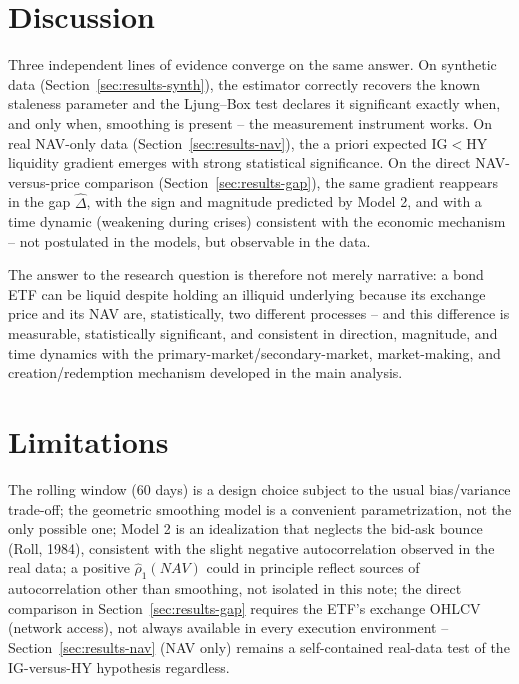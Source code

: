 \documentclass[11pt]{article}
\begin{document}
\section{Discussion}
\label{sec:discussion}

Three independent lines of evidence converge on the same answer. On synthetic data (Section~\ref{sec:results-synth}), the estimator correctly recovers the known staleness parameter and the Ljung--Box test declares it significant exactly when, and only when, smoothing is present -- the measurement instrument works. On real NAV-only data (Section~\ref{sec:results-nav}), the a priori expected IG$<$HY liquidity gradient emerges with strong statistical significance. On the direct NAV-versus-price comparison (Section~\ref{sec:results-gap}), the same gradient reappears in the gap $\widehat\Delta$, with the sign and magnitude predicted by Model 2, and with a time dynamic (weakening during crises) consistent with the economic mechanism -- not postulated in the models, but observable in the data.

The answer to the research question is therefore not merely narrative: a bond ETF can be liquid despite holding an illiquid underlying because its exchange price and its NAV are, statistically, two different processes -- and this difference is measurable, statistically significant, and consistent in direction, magnitude, and time dynamics with the primary-market/secondary-market, market-making, and creation/redemption mechanism developed in the main analysis.

\section{Limitations}
\label{sec:limits}

The rolling window (60 days) is a design choice subject to the usual bias/variance trade-off; the geometric smoothing model is a convenient parametrization, not the only possible one; Model 2 is an idealization that neglects the bid-ask bounce (Roll, 1984), consistent with the slight negative autocorrelation observed in the real data; a positive $\hat\rho_1(NAV)$ could in principle reflect sources of autocorrelation other than smoothing, not isolated in this note; the direct comparison in Section~\ref{sec:results-gap} requires the ETF's exchange OHLCV (network access), not always available in every execution environment -- Section~\ref{sec:results-nav} (NAV only) remains a self-contained real-data test of the IG-versus-HY hypothesis regardless.
\end{document}
